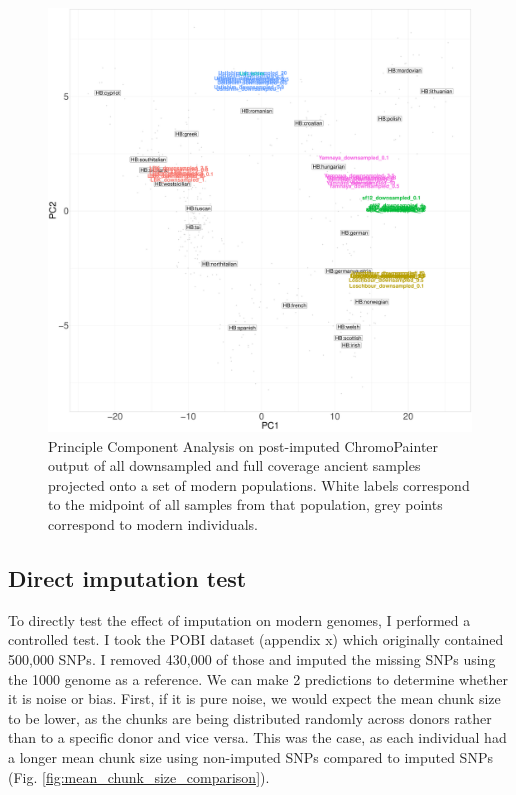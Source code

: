 \begin{figure}[htp]
    \centering
    \includegraphics[width=1.0\textwidth]{../images/chapter1/CP_unlinked_PCA.pdf}
    \caption{Principle Component Analysis on post-imputed ChromoPainter output of all downsampled and full coverage ancient samples projected onto a set of modern populations. White labels correspond to the midpoint of all samples from that population, grey points correspond to modern individuals.}
    \label{fig:CP_unlinked_PCA}
\end{figure}


\subsection{Direct imputation test}

To directly test the effect of imputation on modern genomes, I performed a controlled test. I took the POBI dataset (appendix x) which originally contained 500,000 SNPs. I removed 430,000 of those and imputed the missing SNPs using the 1000 genome as a reference. We can make 2 predictions to determine whether it is noise or bias. First, if it is pure noise, we would expect the mean chunk size to be lower, as the chunks are being distributed randomly across donors rather than to a specific donor and vice versa. This was the case, as each individual had a longer mean chunk size using non-imputed SNPs compared to imputed SNPs (Fig. \ref{fig:mean_chunk_size_comparison}).


